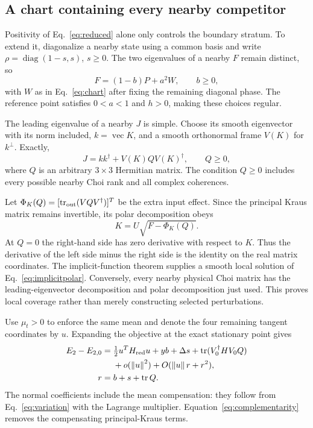 \documentclass[aps,pra,reprint,amsmath,amssymb,longbibliography]{revtex4-2}
\newcommand{\tr}{\operatorname{tr}}
\newcommand{\diag}{\operatorname{diag}}
\newcommand{\vecop}{\operatorname{vec}}
\newcommand{\norm}[1]{\left\lVert#1\right\rVert}
\begin{document}
\subsection{A chart containing every nearby competitor}
Positivity of Eq.~\eqref{eq:reduced} alone only controls the boundary stratum. To extend it, diagonalize a nearby state using a common basis and write $\rho=\diag(1-s,s)$, $s\ge0$. The two eigenvalues of a nearby $F$ remain distinct, so
\begin{equation}
 F=(1-b)P+a^2W,\qquad b\ge0,\label{eq:effectchart}
\end{equation}
with $W$ as in Eq.~\eqref{eq:chart} after fixing the remaining diagonal phase. The reference point satisfies $0<a<1$ and $h>0$, making these choices regular.

The leading eigenvalue of a nearby $J$ is simple. Choose its smooth eigenvector with its norm included, $k=\vecop K$, and a smooth orthonormal frame $V(K)$ for $k^\perp$. Exactly,
\begin{equation}
 J=kk^\dagger+V(K)QV(K)^\dagger,\qquad Q\ge0,\label{eq:fullchart}
\end{equation}
where $Q$ is an arbitrary $3\times3$ Hermitian matrix. The condition $Q\ge0$ includes every possible nearby Choi rank and all complex coherences.

Let $\Phi_K(Q)=[\tr_{\rm out}(VQV^\dagger)]^T$ be the extra input effect. Since the principal Kraus matrix remains invertible, its polar decomposition obeys
\begin{equation}
 K=U\sqrt{F-\Phi_K(Q)}.\label{eq:implicitpolar}
\end{equation}
At $Q=0$ the right-hand side has zero derivative with respect to $K$. Thus the derivative of the left side minus the right side is the identity on the real matrix coordinates. The implicit-function theorem supplies a smooth local solution of Eq.~\eqref{eq:implicitpolar}. Conversely, every nearby physical Choi matrix has the leading-eigenvector decomposition and polar decomposition just used. This proves local coverage rather than merely constructing selected perturbations.

Use $\mu_t>0$ to enforce the same mean and denote the four remaining tangent coordinates by $u$. Expanding the objective at the exact stationary point gives
\begin{align}
 E_2-E_{2,0}={}&\tfrac12u^TH_{\rm red}u+yb+\Delta s
 +\tr(V_0^\dagger HV_0Q)\nonumber\\
 &+o(\norm{u}^2)+O(\norm{u}r+r^2),\label{eq:expansion}\\
 r={}&b+s+\tr Q.\nonumber
\end{align}
The normal coefficients include the mean compensation: they follow from Eq.~\eqref{eq:variation} with the Lagrange multiplier. Equation~\eqref{eq:complementarity} removes the compensating principal-Kraus terms.
\end{document}
